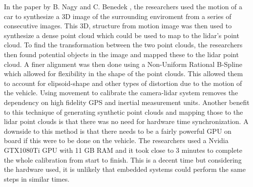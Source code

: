 In the paper by B. Nagy and C. Benedek \cite{nagyOntheFlyCameraLidar2020}, the researchers used the motion of a car to synthesize a 3D image of the surrounding enviroment from a series of consecutive images. This 3D, structure from motion image was then used to synthesize a dense point cloud which could be used to map to the lidar's point cloud.
To find the transformation between the two point clouds, the researchers then found potential objects in the image and mapped these to the lidar point cloud. A finer alignment was then done using a Non-Uniform Rational B-Spline which allowed for flexibility in the shape of the point clouds. This allowed them to account for elipsoid-shape and other types of distortion due to the motion of the vehicle.\newline
Using movement to calibrate the camera-lidar system removes the dependency on high fidelity GPS and inertial measurement units. Another benefit to this technique of generating synthetic point clouds and mapping those to the lidar point clouds is that there was no need for hardware time synchronization. A downside to this method is that there needs to be a fairly powerful GPU on board if this were to be done on the vehicle. The researchers used a Nvidia GTX1080Ti GPU with 11 GB RAM and it took close to 3 minutes to complete the whole calibration from start to finish. This is a decent time but considering the hardware used, it is unlikely that embedded systems could perform the same steps in similar times.







